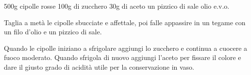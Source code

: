 \begin{ingreds}
	500g cipolle rosse
	100g di zucchero
	30g di aceto
	un pizzico di sale
	olio e.v.o.

\end{ingreds}

\begin{method}
Taglia a metà le cipolle sbucciate e affettale, poi falle appassire in un tegame con un filo d'olio e un pizzico di sale.

Quando le cipolle iniziano a sfrigolare aggiungi lo zucchero e continua a cuocere a fuoco moderato. Quando sfrigola di nuovo aggiungi l'aceto per fissare il colore e dare il giusto grado di acidità utile per la conservazione in vaso.



\end{method}



